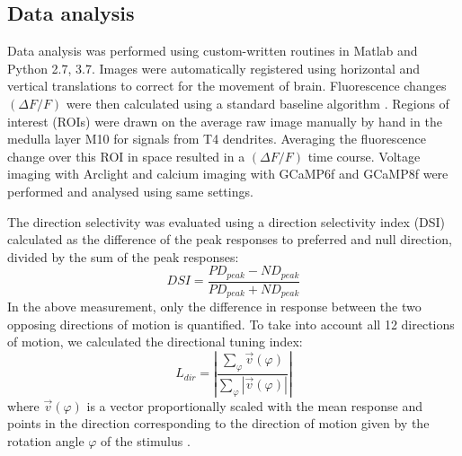 \documentclass[9pt,lineno]{elife}
\begin{document}
\subsection{Data analysis}
Data analysis was performed using custom-written routines in Matlab and Python 2.7, 3.7. Images were automatically registered using horizontal and vertical translations to correct for the movement of brain. Fluorescence changes $(\Delta F/F)$ were then calculated using a standard baseline algorithm \parencite{Jia2011}. Regions of interest (ROIs) were drawn on the average raw image manually by hand in the medulla layer M10 for signals from T4 dendrites. Averaging the fluorescence change over this ROI in space resulted in a $(\Delta F/F)$ time course. Voltage imaging with Arclight and calcium imaging with GCaMP6f and GCaMP8f were performed and analysed using same settings.

The direction selectivity was evaluated using a direction selectivity index (DSI) calculated as the difference of the peak responses to preferred and null direction, divided by the sum of the peak responses:
\begin{equation}
DSI = \frac{PD_{peak} - ND_{peak}}{PD_{peak} + ND_{peak}}
\label{DSIequation}
\end{equation}
In the above measurement, only the difference in response between the two opposing directions of motion is quantified. To take into account all 12 directions of motion, we calculated the directional tuning index:
\begin{equation}
L_{dir} = \left|\frac{\sum_{\varphi}^{}{\vec{v}(\varphi)}}{\sum_{\varphi}^{}{|\vec{v}(\varphi)|}}\right|
\label{Ldirequation}
\end{equation}
where $\vec{v}(\varphi)$ is a vector proportionally scaled with the mean response and points in the direction corresponding to the direction of motion given by the rotation angle $\varphi$ of the stimulus \parencite{Mazurek2014}.
\end{document}
